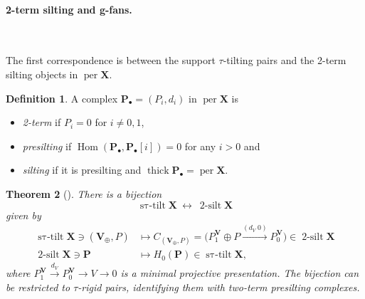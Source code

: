 \documentclass[11pt,reqno]{amsart}
\theoremstyle{plain}
\newtheorem{theorem}{Theorem}[section]
\theoremstyle{definition}
\newtheorem{definition}[theorem]{Definition}
\numberwithin{equation}{section}
\newcommand\hua{\mathcal}
\newcommand\<{\langle}
\renewcommand\>{\rangle}
\newcommand\Hom{\operatorname{Hom}}
\newcommand{\C}{\operatorname{\hua{C}}} %
\newcommand{\per}{\operatorname{per}} %
\newcommand{\on}[1]{\operatorname{#1}}
\def\pvd{\on{pvd}}%
\newcommand{\pcts}[1]{\mathbf{#1}}%
\newcommand{\pcto}[1]{\mathbf{#1}_\oplus} %
\begin{document}

\paragraph{\textbf{2-term silting and g-fans.}}\

The first correspondence is between the support $\tau$-tilting pairs and the 2-term silting objects in $\per \pcts{X}$.

\begin{definition}
A complex $\mathbf{P}_\bullet=(P_i,d_i)$ in $\per\pcts{X}$ is 
\begin{itemize}
    \item \emph{2-term} if $P_i=0$ for $i\ne0,1$,
    \item \emph{presilting} if $\Hom(\mathbf{P}_\bullet,\mathbf{P}_\bullet[i])=0$ for any $i>0$ and
    \item \emph{silting} if it is presilting and $\on{thick}\mathbf{P}_\bullet=\per \pcts{X}$. 
\end{itemize}
\end{definition}


\begin{theorem}[{\cite[Thms.~3.2]{AIR}}]
\label{thm:app-tau-dictionary}
There is a bijection
\[
 \on{s\tau-tilt}\pcts{X}\ \longleftrightarrow\
 \on{2-silt}\pcts{X}
\]
given by
\begin{align}
    \on{s\tau-tilt}\pcts{X}\ni (\pcto{V},P)&\mapsto C_{(\pcto{V},P)}=\bigl(P_1^\pcts{V}\oplus P\xrightarrow{(d_V\;0)}P_0^\pcts{V}\bigr)\in\on{2-silt}\pcts{X}\\
    \on{2-silt}\pcts{X}\ni \mathbf{P}&\mapsto H_0(\mathbf{P})\in\on{s\tau-tilt}\pcts{X},
\end{align}
where $P_1^\pcts{V}\xrightarrow{d_V}P_0^\pcts{V}\to V\to0$ is a minimal projective presentation. 
The bijection can be restricted to $\tau$-rigid pairs, identifying them with two-term presilting complexes. 
\end{theorem}

\end{document}
